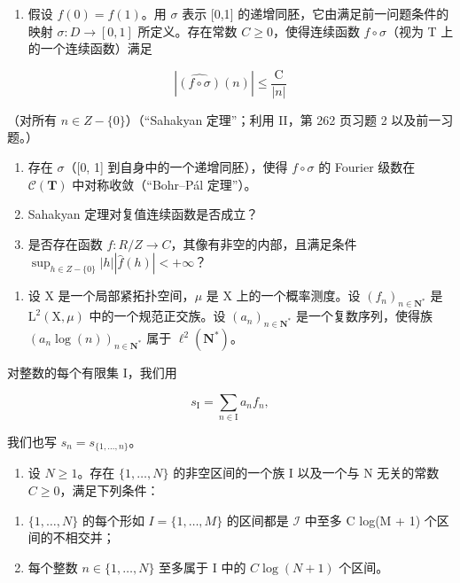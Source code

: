 \begin{enumerate}
\def\labelenumi{\alph{enumi})}
\setcounter{enumi}{2}
\tightlist
\item
  假设 \(f(0) = f(1)\)。用 \(\sigma\) 表示 {[}0,1{]} 的递增同胚，它由满足前一问题条件的映射 \(\sigma: D \to [0,1]\) 所定义。存在常数 \(C \geqslant 0\)，使得连续函数 \(f \circ \sigma\)（视为 T 上的一个连续函数）满足
\end{enumerate}

\[
| \widehat {(f \circ \sigma)} (n) | \leqslant \frac {\mathrm{C}}{| n |}
\]

（对所有 \(n \in Z - \{0\}\)）（“Sahakyan 定理”；利用 II，第 262 页习题 2 以及前一习题。）

\begin{enumerate}
\def\labelenumi{\alph{enumi})}
\setcounter{enumi}{3}
\item
  存在 \(\sigma\)（{[}0, 1{]} 到自身中的一个递增同胚），使得 \(f \circ \sigma\) 的 Fourier 级数在 \(\mathcal{C}(\mathbf{T})\) 中对称收敛（“Bohr–Pál 定理”）。
\item
  Sahakyan 定理对复值连续函数是否成立？
\item
  是否存在函数 \(f: R/Z \to C\)，其像有非空的内部，且满足条件 \(\sup_{h \in Z - \{0\}} |h||\widehat{f}(h)| < +\infty\)？
\end{enumerate}

\begin{enumerate}
\def\labelenumi{\arabic{enumi})}
\setcounter{enumi}{46}
\tightlist
\item
  设 X 是一个局部紧拓扑空间，\(\mu\) 是 X 上的一个概率测度。设 \((f_n)_{n\in \mathbf{N}^*}\) 是 \(\mathrm{L}^2 (\mathrm{X},\mu)\) 中的一个规范正交族。设 \((a_{n})_{n\in \mathbf{N}^{*}}\) 是一个复数序列，使得族 \((a_{n}\log (n))_{n\in \mathbf{N}^{*}}\) 属于 \(\ell^2 (\mathbf{N}^*)\)。
\end{enumerate}

对整数的每个有限集 I，我们用

\[
s _ {\mathrm{I}} = \sum_ {n \in \mathrm{I}} a _ {n} f _ {n},
\]

我们也写 \(s_{n} = s_{\{1,\ldots,n\}}\)。

\begin{enumerate}
\def\labelenumi{\alph{enumi})}
\tightlist
\item
  设 \(N \geqslant 1\)。存在 \(\{1, \ldots, N\}\) 的非空区间的一个族 I 以及一个与 N 无关的常数 \(C \geqslant 0\)，满足下列条件：
\end{enumerate}

\begin{enumerate}
\def\labelenumi{(\roman{enumi})}
\item
  \(\{1, \ldots, N\}\) 的每个形如 \(I = \{1, \ldots, M\}\) 的区间都是 \(\mathcal{I}\) 中至多 C log(M + 1) 个区间的不相交并；
\item
  每个整数 \(n \in \{1, \ldots, N\}\) 至多属于 I 中的 \(C \log(N + 1)\) 个区间。
\end{enumerate}

